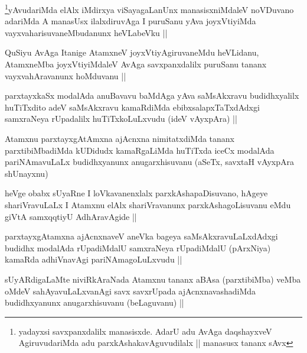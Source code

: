 \begin{artha}
\footnote{yadayxsi savxpanxdalilx manasisxde. AdarU adu AvAga daqshayxveV AgiruvudariMda adu parxkAshakavAguvudilalx || manasusx tananx sAvx}yAvudariMda elAlx iMdirxya viSayagaLanUnx manasisxniMdaleV noVDuvano adariMda A manasUsx ilalxdiruvAga I puruSanu yAva joyxVtiyiMda vayxvaharisuvaneMbudanunx heVLabeVku ||
\end{artha}

\begin{artha}
QuSiyu AvAga Itanige AtamxneV joyxVtiyAgiruvaneMdu heVLidanu, AtamxneMba joyxVtiyiMdaleV AvAga savxpanxdalilx puruSanu tananx vayxvahAravanunx hoMduvanu ||
\end{artha}

\begin{artha}
parxtayxkaSx modalAda anuBavavu baMdAga yAva saMsAkxravu budidhxyalilx huTiTxdito adeV saMsAkxravu kamaRdiMda ebibxsalapxTaTxdAdxgi samxraNeya rUpadalilx huTiTxkoLuLxvudu (ideV vAyxpAra) ||
\end{artha}

\begin{artha}
Atamxnu parxtayxgAtAmxna ajAcnxna nimitatxdiMda tananx parxtibiMbadiMda kUDidudx kamaRgaLiMda huTiTxda iceCx modalAda pariNAmavuLaLx budidhxyanunx anugarxhisuvanu (aSeTx, savxtaH vAyxpAra shUnayxnu)
\end{artha}

\begin{artha}
heVge obabx sUyaRne I loVkavanenxlalx parxkAshapaDisuvano, hAgeye shariVravuLaLx I Atamxnu elAlx shariVravanunx parxkAshagoLisuvanu eMdu giVtA samxqqtiyU AdhAravAgide ||
\end{artha}

\begin{artha}
parxtayxgAtamxna ajAcnxnaveV aneVka bageya saMsAkxravuLaLxdAdxgi budidhx modalAda rUpadiMdalU samxraNeya rUpadiMdalU (pArxNiya) kamaRda adhiVnavAgi pariNAmagoLuLxvudu ||
\end{artha}

\begin{artha}
sUyARdigaLaMte niviRkAraNada Atamxnu tananx aBAsa (parxtibiMba) veMba oMdeV sahAyavuLaLxvanAgi savx savxrUpada ajAcnxnavashadiMda budidhxyanunx anugarxhisuvanu (beLaguvanu) ||
\end{artha}

